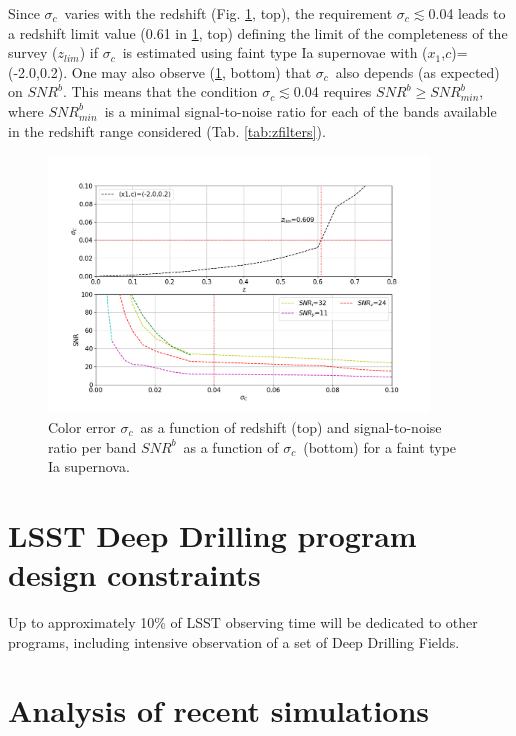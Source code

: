 \documentclass[\docopts]{\docclass}
\newcommand{\snrb}{\mbox{$SNR^b$}}
\newcommand{\snrbmin}{\mbox{$SNR^b_{min}$}}
\newcommand{\strech}{$x_1$}
\newcommand{\col}{$c$}
\newcommand{\sigc}{\mbox{$\sigma_c$}}
\newcommand{\zlim}{\mbox{$z_{lim}$}}
\begin{document}
Since \sigc~varies with the redshift  (Fig. \ref{fig:sigc_z}, top), the requirement \sigc$\lesssim$0.04 leads to a redshift limit value (0.61 in \ref{fig:sigc_z}, top) defining the limit of the completeness of the survey (\zlim) if \sigc~is estimated using faint type Ia supernovae with (\strech,\col)=(-2.0,0.2). One may also observe (\ref{fig:sigc_z}, bottom) that \sigc~also depends (as expected) on \snrb. This means that the condition \sigc$\lesssim$0.04 requires \snrb$\geq$\snrbmin, where \snrbmin~is a minimal signal-to-noise ratio for each of the bands available in the redshift range considered (Tab. \ref{tab:zfilters}).

\begin{figure}[htbp]
\begin{center}
  \includegraphics[width=0.9\textwidth]{sigmaC_z.png}
 \caption{Color error \sigc~as a function of redshift (top) and signal-to-noise ratio per band \snrb~as a function of \sigc~(bottom) for a faint type Ia supernova.}\label{fig:sigc_z}
\end{center}
\end{figure}


\section{LSST Deep Drilling program design constraints}
\label{sec:design}

Up to approximately 10\% of LSST observing time will be dedicated to other programs, including intensive observation of a set of Deep Drilling Fields. 



\section{Analysis of recent simulations}
\end{document}
